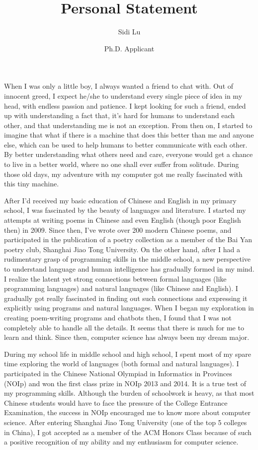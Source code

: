 \documentclass{article}
\title{Personal Statement}
\author{Sidi Lu}
\date{Ph.D. Applicant}
\begin{document}
      \maketitle%
      \thispagestyle{empty}
      \vspace{35pt}
    
      When I was only a little boy, I always wanted a friend to chat with. Out of innocent greed, I expect he/she to understand every single piece of idea in my head, with endless passion and patience. I kept looking for such a friend, ended up with understanding a fact that, it's hard for humans to understand each other, and that understanding me is not an exception. From then on, I started to imagine that what if there is a machine that does this better than me and anyone else, which can be used to help humans to better communicate with each other. By better understanding what others need and care, everyone would get a chance to live in a better world, where no one shall ever suffer from solitude. During those old days, my adventure with my computer got me really fascinated with this tiny machine. 

      After I'd received my basic education of Chinese and English in my primary school, I was fascinated by the beauty of languages and literature. I started my attempts at writing poems in Chinese and even English (though poor English then) in 2009. Since then, I've wrote over 200 modern Chinese poems, and participated in the publication of a poetry collection as a member of the Bai Yan poetry club, Shanghai Jiao Tong University. On the other hand, after I had a rudimentary grasp of programming skills in the middle school, a new perspective to understand language and human intelligence has gradually formed in my mind. I realize the latent yet strong connections between formal languages (like programming languages) and natural languages (like Chinese and English). I gradually got really fascinated in finding out such connections and expressing it explicitly using programs and natural languages. When I began my exploration in creating poem-writing programs and chatbots then, I found that I was not completely able to handle all the details. It seems that there is much for me to learn and think. Since then, computer science has always been my dream major. 
      
      During my school life in middle school and high school, I spent most of my spare time exploring the world of languages (both formal and natural languages). I participated in the Chinese National Olympiad in Informatics in Provinces (NOIp) and won the first class prize in NOIp 2013 and 2014. It is a true test of my programming skills. Although the burden of schoolwork is heavy, as that most Chinese students would have to face the pressure of the College Entrance Examination, the success in NOIp encouraged me to know more about computer science. After entering Shanghai Jiao Tong University (one of the top 5 colleges in China), I got accepted as a member of the ACM Honors Class because of such a positive recognition of my ability and my enthusiasm for computer science. 
\end{document}

